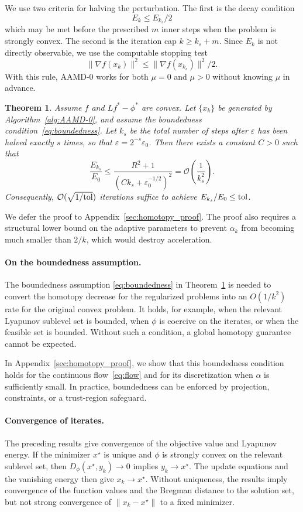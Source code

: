 \documentclass{article}
\theoremstyle{plain}
\newtheorem{theorem}{Theorem}[section]
\theoremstyle{definition}
\theoremstyle{remark}
\begin{document}
We use two criteria for halving the perturbation. The first is the decay condition
$$
E_k\le E_{k_s}/2
$$
which may be met before the prescribed $m$ inner steps when the problem is strongly convex. The second is the iteration cap $k\ge k_s+m$. Since $E_k$ is not directly observable, we use the computable stopping test
$$
\|\nabla f(x_k)\|^2\leq \|\nabla f(x_{k_s})\|^2/2.
$$
With this rule, AAMD-0 works for both $\mu=0$ and $\mu>0$ without knowing $\mu$ in advance.

\begin{theorem}\label{thm:homotopy}
Assume $f$ and $Lf^*-\phi^*$ are convex. Let $\{x_k\}$ be generated by Algorithm~\ref{alg:AAMD-0}, and assume the boundedness condition~\eqref{eq:boundedness}. Let $k_s$ be the total number of steps after $\varepsilon$ has been halved exactly $s$ times, so that $\varepsilon=2^{-s}\varepsilon_0$. Then there exists a constant $C>0$ such that
$$
\frac{E_{k_s}}{E_0}
\le
\frac{R^2+1}{\left(Ck_s+\varepsilon_0^{-1/2}\right)^2}
=
\mathcal O\left(\frac{1}{k_s^2}\right).
$$
Consequently, $\mathcal O(\sqrt{1/{\rm tol}})$ iterations suffice to achieve $E_{k_s}/E_0\le {\rm tol}$.
\end{theorem}

We defer the proof to Appendix~\ref{sec:homotopy_proof}. The proof also requires a structural lower bound on the adaptive parameters to prevent $\alpha_k$ from becoming much smaller than $2/k$, which would destroy acceleration.

\paragraph{On the boundedness assumption.}
The boundedness assumption \eqref{eq:boundedness} in Theorem~\ref{thm:homotopy} is needed to convert the homotopy decrease for the regularized problems into an $O(1/k^2)$ rate for the original convex problem. It holds, for example, when the relevant Lyapunov sublevel set is bounded, when $\phi$ is coercive on the iterates, or when the feasible set is bounded. Without such a condition, a global homotopy guarantee cannot be expected. 

In Appendix~\ref{sec:homotopy_proof}, we show that this boundedness condition holds for the continuous flow~\eqref{eq:flow} and for its discretization when $\alpha$ is sufficiently small. In practice, boundedness can be enforced by projection, constraints, or a trust-region safeguard.

\paragraph{Convergence of iterates.}
The preceding results give convergence of the objective value and Lyapunov energy. If the minimizer $x^\star$ is unique and $\phi$ is strongly convex on the relevant sublevel set, then $D_\phi(x^\star,y_k)\to0$ implies $y_k\to x^\star$. The update equations and the vanishing energy then give $x_k\to x^\star$. Without uniqueness, the results imply convergence of the function values and the Bregman distance to the solution set, but not strong convergence of $\|x_k-x^\star\|$ to a fixed minimizer.
\end{document}
